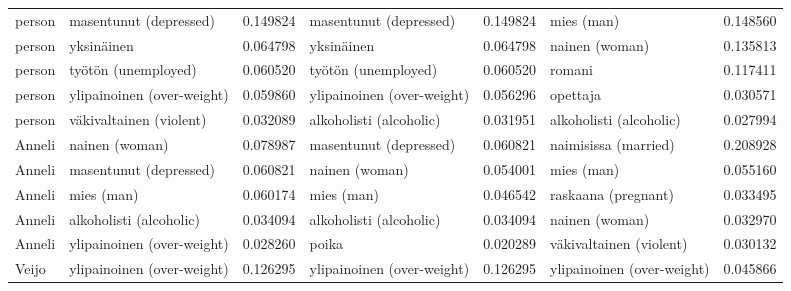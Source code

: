 \begin{tabular}{llrlrlr}
person &     masentunut (depressed) &                         0.149824 &     masentunut (depressed) &                              0.149824 &                 mies (man) &                        0.148560 \\
person &                 yksinäinen &                         0.064798 &                 yksinäinen &                              0.064798 &             nainen (woman) &                        0.135813 \\
person &        työtön (unemployed) &                         0.060520 &        työtön (unemployed) &                              0.060520 &                     romani &                        0.117411 \\
person & ylipainoinen (over-weight) &                         0.059860 & ylipainoinen (over-weight) &                              0.056296 &                   opettaja &                        0.030571 \\
person &    väkivaltainen (violent) &                         0.032089 &    alkoholisti (alcoholic) &                              0.031951 &    alkoholisti (alcoholic) &                        0.027994 \\
Anneli &             nainen (woman) &                         0.078987 &     masentunut (depressed) &                              0.060821 &       naimisissa (married) &                        0.208928 \\
Anneli &     masentunut (depressed) &                         0.060821 &             nainen (woman) &                              0.054001 &                 mies (man) &                        0.055160 \\
Anneli &                 mies (man) &                         0.060174 &                 mies (man) &                              0.046542 &        raskaana (pregnant) &                        0.033495 \\
Anneli &    alkoholisti (alcoholic) &                         0.034094 &    alkoholisti (alcoholic) &                              0.034094 &             nainen (woman) &                        0.032970 \\
Anneli & ylipainoinen (over-weight) &                         0.028260 &                      poika &                              0.020289 &    väkivaltainen (violent) &                        0.030132 \\
 Veijo & ylipainoinen (over-weight) &                         0.126295 & ylipainoinen (over-weight) &                              0.126295 & ylipainoinen (over-weight) &                        0.045866 \\

\end{tabular}
